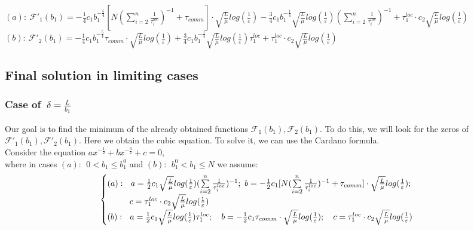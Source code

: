 \documentclass{article}
\begin{document}
$(a): ~\mathcal{F'}_1(b_1) = -\frac{1}{4}c_1 b_1^{-\frac{5}{4}}  [N (\sum\limits_{i = 2}^{n} \frac{1}{\tau_i^{loc}})^{-1} + \tau_{comm}]\cdot 
\sqrt{\frac{L}{\mu}}log (\frac{1}{\varepsilon})  - 
\frac{3}{4} c_1 b_1^{-\frac{1}{4}}   \sqrt{\frac{L}{\mu}}log (\frac{1}{\varepsilon})(\sum\limits_{i = 2}^{n} \frac{1}{\tau_i^{loc}})^{-1} +
\tau_1^{loc}\cdot c_2  \sqrt{\frac{L}{\mu}}log (\frac{1}{\varepsilon})$ \\
$(b): ~\mathcal{F'}_2(b_1) = -\frac{1}{4}c_1 b_1^{-\frac{5}{4}} \tau_{comm}\cdot \sqrt{\frac{L}{\mu}}log (\frac{1}{\varepsilon}) + \frac{3}{4} c_1 b_1^{-\frac{1}{4}}  \sqrt{\frac{L}{\mu}}log (\frac{1}{\varepsilon})\tau_1^{loc}   + \tau_1^{loc}\cdot c_2  \sqrt{\frac{L}{\mu}}log (\frac{1}{\varepsilon})$\\

\subsection{Final solution in limiting cases}
\subsubsection{Case of $~\delta = \frac{L}{b_1}$}\label{eq:3.4.1}
Our goal is to find the minimum of the already obtained functions $\mathcal{F}_1(b_1), \mathcal{F}_2(b_1)$. To do this, we will look for the zeros of $\mathcal{F'}_1(b_1), \mathcal{F'}_2(b_1)$. Here we obtain the cubic equation.
To solve it, we can use the Cardano formula.\\
Consider the equation $ax^{-\frac{1}{2}} + bx^{-\frac{3}{2}} + c = 0$,\\
where in cases $(a): ~ ~ 0 < b_1 \leq b_1^0 $ and $(b): ~ ~ b_1^0 <  b_1 \leq N$ we assume:
\begin{eqnarray}
\notag
    \begin{cases}
    (a): ~ ~ a = \frac{1}{2} c_1 \sqrt{\frac{L}{\mu}}log (\frac{1}{\varepsilon})(\sum\limits_{i = 2}^{n} \frac{1}{\tau_i^{loc}})^{-1}; ~
b = -\frac{1}{2} c_1 [N (\sum\limits_{i = 2}^{n} \frac{1}{\tau_i^{loc}})^{-1} + \tau_{comm}]\cdot 
\sqrt{\frac{L}{\mu}}log (\frac{1}{\varepsilon});\\
\quad\quad~~ c = \tau_1^{loc}\cdot c_2  \sqrt{\frac{L}{\mu}}log (\frac{1} {\varepsilon})
    \\
\notag
    (b): ~ ~ a = \frac{1}{2} c_1  \sqrt{\frac{L}{\mu}}log (\frac{1}{\varepsilon})\tau_1^{loc}; \quad 
b = -\frac{1}{2}c_1 \tau_{comm}\cdot \sqrt{\frac{L}{\mu}}log (\frac{1}{\varepsilon}); \quad 
c = \tau_1^{loc}\cdot c_2  \sqrt{\frac{L}{\mu}}log (\frac{1} {\varepsilon})
    \end{cases}\,
\end{eqnarray}
\end{document}
